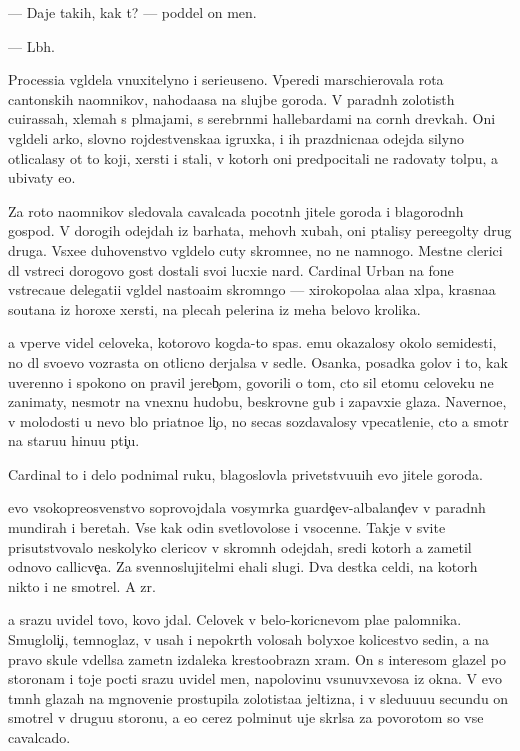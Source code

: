 \documentclass[10pt]{book}
\begin{document}
— Daje takih, kak t{\yi}? — poddel on men{\ia}.

— L{\io}b{\yi}h.

Processi{\y}a v{\yi}gl{\ia}dela vnuxitelyno i serieuseno. Vperedi marschierovala rota cantonskih na{\y}omnikov, nahod{\ia}{\x}a{\y}asa na slujbe goroda. V paradn{\yi}h zolotist{\yi}h cuirassah, xlemah s pl{\io}majami, s serebr{\ia}n{\yi}mi hallebardami na corn{\yi}h drevkah. Oni v{\yi}gl{\ia}deli {\y}arko, slovno rojdestvenska{\y}a igruxka, i ih prazdnicna{\y}a odejda silyno otlicalasy ot to{\y} koji, xersti i stali, v kotor{\yi}h oni predpocitali ne radovaty tolpu, a ubivaty {\y}e{\y}o.

Za roto{\y} na{\y}omnikov sledovala cavalcada pocotn{\yi}h jitele{\y} goroda i blagorodn{\yi}h gospod. V dorogih odejdah iz barhata, mehov{\yi}h xubah, oni p{\yi}talisy pere{\x}egol{\ia}ty drug druga. V{\yi}sxe{\y}e duhovenstvo v{\yi}gl{\ia}delo cuty skromne{\y}e, no ne namnogo. Mestn{\yi}{\y}e clerici dl{\ia} vstreci dorogovo gost{\ia} dostali svo{\y}i lucxi{\y}e nar{\ia}d{\yi}. Cardinal Urban na fone vstreca{\y}u{\x}e{\y} delegati{\y}i v{\yi}gl{\ia}del nasto{\y}a{\x}im skromn{\ia}go{\y} — xirokopola{\y}a ala{\y}a xl{\ia}pa, krasna{\y}a soutana iz horoxe{\y} xersti, na plecah pelerina iz meha belovo krolika.

{\Y}a vperv{\yi}{\y}e videl celoveka, kotorovo kogda-to spas. {\Y}emu okazalosy okolo semides{\ia}ti, no dl{\ia} svo{\y}evo vozrasta on otlicno derjalsa v sedle. Osanka, posadka golov{\yi} i to, kak uverenno i spoko{\y}no on pravil jereb{\c}om, govorili o tom, cto sil etomu celoveku ne zanimaty, nesmotr{\ia} na vnexn{\io}{\y}u hudobu, beskrovn{\yi}{\y}e gub{\yi} i zapavxi{\y}e glaza. Naverno{\y}e, v molodosti u nevo b{\yi}lo pri{\y}atno{\y}e li{\c}o, no se{\y}cas sozdavalosy vpecatleni{\y}e, cto {\y}a smotr{\io} na staru{\y}u hi{\x}nu{\y}u pti{\c}u.

Cardinal to i delo podnimal ruku, blagoslovl{\ia}{\y}a privetstvu{\y}u{\x}ih {\y}evo jitele{\y} goroda.

{\Y}evo v{\yi}sokopreosv{\ia}{\x}enstvo soprovojdala vosym{\e}rka guarde{\y}{\c}ev-albaland{\c}ev v paradn{\yi}h mundirah i beretah. Vse kak odin svetlovolos{\yi}{\y}e i v{\yi}socenn{\yi}{\y}e. Takje v svite prisutstvovalo neskolyko clericov v skromn{\yi}h odejdah, sredi kotor{\yi}h {\y}a zametil odnovo callicve{\c}a. Za sv{\ia}{\x}ennoslujitel{\ia}mi {\y}ehali slugi. Dva des{\ia}tka cel{\ia}di, na kotor{\yi}h nikto i ne smotrel. A zr{\ia}.

{\Y}a srazu uvidel tovo, kovo jdal. Celovek v belo-koricnevom pla{\x}e palomnika. Smugloli{\c}i{\y}, temnoglaz{\yi}{\y}, v usah i nepokr{\yi}t{\yi}h volosah bolyxo{\y}e kolicestvo sedin{\yi}, a na pravo{\y} skule v{\yi}del{\ia}lsa zametn{\yi}{\y} izdaleka krestoobrazn{\yi}{\y} xram. On s interesom glazel po storonam i toje pocti srazu uvidel men{\ia}, napolovinu v{\yi}sunuvxevosa iz okna. V {\y}evo t{\e}mn{\yi}h glazah na mgnoveni{\y}e prostupila zolotista{\y}a jeltizna, i v sledu{\y}u{\x}u{\y}u secundu on smotrel v drugu{\y}u storonu, a {\y}e{\x}o cerez polminut{\yi} uje skr{\yi}lsa za povorotom so vse{\y} cavalcado{\y}.
\end{document}
